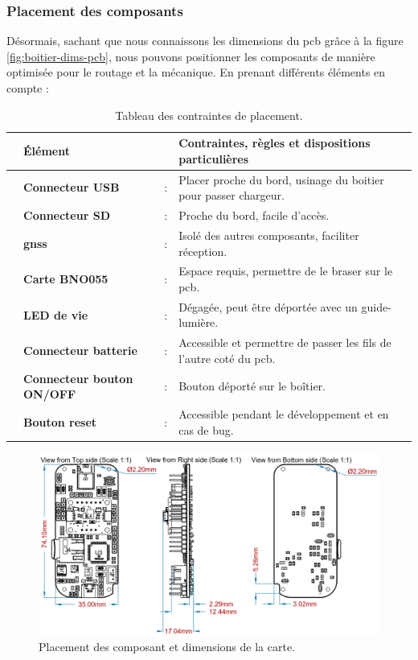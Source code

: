 \subsubsection{Placement des composants} \label{ssec:placementComp}
Désormais, sachant que nous connaissons les dimensions du \gls{pcb} grâce à la figure \ref{fig:boitier-dims-pcb}, nous pouvons positionner les composants de manière optimisée pour le routage et la mécanique. En prenant différents éléments en compte :

\begin{table}[!h]
\begin{adjustbox}{max width=\textwidth}
	\begin{tabular}{llll}
	\hline
	& Élément & & Contraintes, règles et dispositions particulières \\
	\hline
	\faChevronRight & \textbf{Connecteur USB} & : & Placer proche du bord, usinage du boitier pour passer chargeur. \\
	\faChevronRight & \textbf{Connecteur \micro SD} & : & Proche du bord, facile d'accès. \\
	\faChevronRight & \textbf{\gls{gnss}} & : & Isolé des autres composants, faciliter réception. \\
	\faChevronRight & \textbf{Carte BNO055} & : & Espace requis, permettre de le braser sur le \gls{pcb}. \\
	\faChevronRight & \textbf{LED de vie} & : & Dégagée, peut être déportée avec un guide-lumière. \\
	\faChevronRight & \textbf{Connecteur batterie} & : & Accessible et permettre de passer les fils de l'autre coté du \gls{pcb}. \\
	\faChevronRight & \textbf{Connecteur bouton ON/OFF} & : & Bouton déporté sur le boîtier. \\
	\faChevronRight & \textbf{Bouton reset} & : & Accessible pendant le développement et en cas de bug. \\
	\end{tabular}	
\end{adjustbox}
\caption{Tableau des contraintes de placement.}
\label{tab:reglesPlacement}
\end{table}

\clearpage

\begin{figure}[h]
	\centering
	\includegraphics[width=.83\linewidth]{../figures/dev-pcb/PCB-Dims.jpg}
	\caption{Placement des composant et dimensions de la carte.}
	\label{fig:pcb-dims}
\end{figure}

